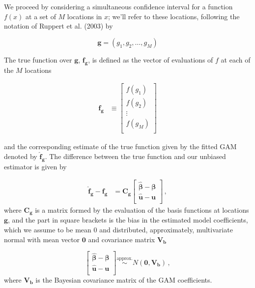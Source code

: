 \documentclass[12pt,]{article}
\begin{document}
We proceed by considering a simultaneous confidence interval for a
function \(f(x)\) at a set of \(M\) locations in \(x\); we'll refer to
these locations, following the notation of Ruppert et al. (2003) by

\[
\mathbf{g} = (g_1, g_2, \ldots, g_M)
\]

The true function over \(\mathbf{g}\), \(\mathbf{f_g}\), is defined as
the vector of evaluations of \(f\) at each of the \(M\) locations

\[
\begin{aligned}
    \mathbf{f_g} &\equiv \begin{bmatrix}
           f(g_1) \\
           f(g_2) \\
           \vdots \\
           f({g_M}) \\
         \end{bmatrix}
\end{aligned}
\]

and the corresponding estimate of the true function given by the fitted
GAM denoted by \(\hat{\mathbf{f}}_{\mathbf{g}}\). The difference between
the true function and our unbiased estimator is given by

\[
\begin{aligned}
    \hat{\mathbf{f}}_{\mathbf{g}} - \mathbf{f_g} &= \mathbf{C_g} \begin{bmatrix}
           \boldsymbol{\hat{\beta}} - \boldsymbol{\beta} \\
           \mathbf{\hat{u}} - \mathbf{u} \\
         \end{bmatrix}\, ,
\end{aligned}
\] where \(\mathbf{C_g}\) is a matrix formed by the evaluation of the
basis functions at locations \(\mathbf{g}\), and the part in square
brackets is the bias in the estimated model coefficients, which we
assume to be mean 0 and distributed, approximately, multivariate normal
with mean vector \(\mathbf{0}\) and covariance matrix \(\mathbf{V_b}\)

\[
\begin{bmatrix}
    \boldsymbol{\hat{\beta}} - \boldsymbol{\beta} \\
     \mathbf{\hat{u}} - \mathbf{u} \\
\end{bmatrix} \stackrel{\text{approx.}}{\sim} N \left (\mathbf{0}, \mathbf{V_b} \right )\, ,
\] where \(\mathbf{V_b}\) is the Bayesian covariance matrix of the GAM
coefficients.
\end{document}
